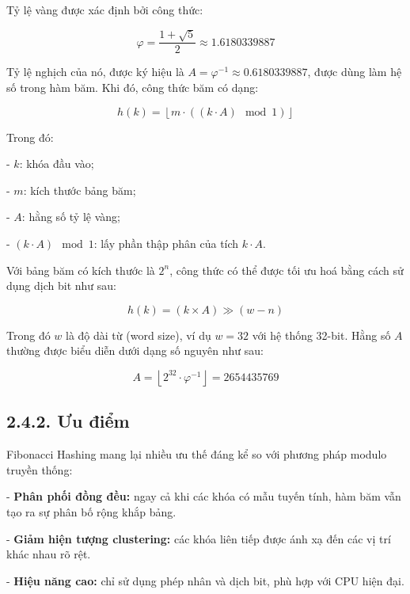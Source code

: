 \documentclass[12pt,a4paper]{report}
\begin{document}
\noindent \indent Tỷ lệ vàng được xác định bởi công thức:

\begin{equation}
    \varphi = \frac{1 + \sqrt{5}}{2} \approx 1.6180339887
\end{equation}

Tỷ lệ nghịch của nó, được ký hiệu là $A = \varphi^{-1} \approx 0.6180339887$, được dùng làm hệ số trong hàm băm. Khi đó, công thức băm có dạng:

\begin{equation}
    h(k) = \left\lfloor m \cdot ((k \cdot A) \mod 1) \right\rfloor
\end{equation}

Trong đó:

    - $k$: khóa đầu vào;
    
    - $m$: kích thước bảng băm;
    
    - $A$: hằng số tỷ lệ vàng;
    
    - $(k \cdot A) \mod 1$: lấy phần thập phân của tích $k \cdot A$.

Với bảng băm có kích thước là $2^n$, công thức có thể được tối ưu hoá bằng cách sử dụng dịch bit như sau:

\begin{equation}
    h(k) = (k \times A) \gg (w - n)
\end{equation}

Trong đó $w$ là độ dài từ (word size), ví dụ $w = 32$ với hệ thống 32-bit. Hằng số $A$ thường được biểu diễn dưới dạng số nguyên như sau:

\begin{equation}
    A = \left\lfloor 2^{32} \cdot \varphi^{-1} \right\rfloor = 2654435769
\end{equation}

\subsection*{2.4.2. Ưu điểm}

\noindent \indent Fibonacci Hashing mang lại nhiều ưu thế đáng kể so với phương pháp modulo truyền thống:

    - \textbf{Phân phối đồng đều:} ngay cả khi các khóa có mẫu tuyến tính, hàm băm vẫn tạo ra sự phân bố rộng khắp bảng.
    
    - \textbf{Giảm hiện tượng clustering:} các khóa liên tiếp được ánh xạ đến các vị trí khác nhau rõ rệt.
    
    - \textbf{Hiệu năng cao:} chỉ sử dụng phép nhân và dịch bit, phù hợp với CPU hiện đại.
    
\end{document}
